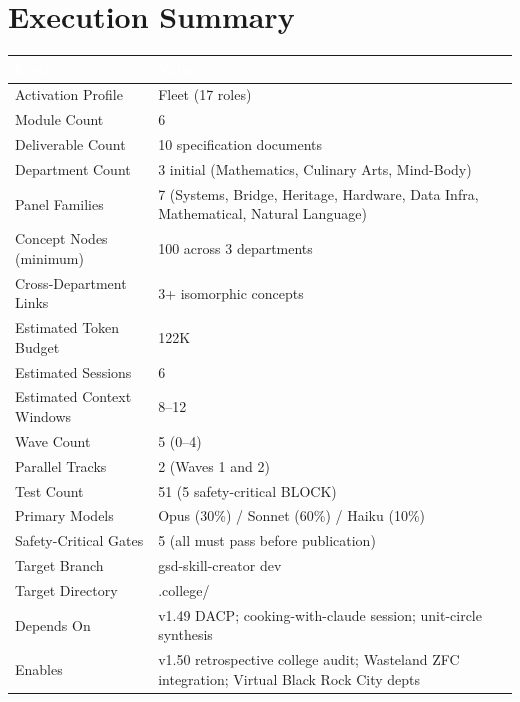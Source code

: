 \documentclass[11pt,letterpaper]{article}
\newcommand{\tableheader}[1]{\textbf{\sffamily\textcolor{white}{#1}}}
\begin{document}
\section{Execution Summary}

\begin{center}
\begin{tabularx}{\textwidth}{L{5cm}X}
\toprule
{}
\tableheader{Metric} & \tableheader{Value} \\
\midrule
Activation Profile & Fleet (17 roles) \\
Module Count & 6 \\
Deliverable Count & 10 specification documents \\
Department Count & 3 initial (Mathematics, Culinary Arts, Mind-Body) \\
Panel Families & 7 (Systems, Bridge, Heritage, Hardware, Data Infra, Mathematical, Natural Language) \\
Concept Nodes (minimum) & 100 across 3 departments \\
Cross-Department Links & 3+ isomorphic concepts \\
Estimated Token Budget & 122K \\
Estimated Sessions & 6 \\
Estimated Context Windows & 8--12 \\
Wave Count & 5 (0--4) \\
Parallel Tracks & 2 (Waves 1 and 2) \\
Test Count & 51 (5 safety-critical BLOCK) \\
Primary Models & Opus (30\%) / Sonnet (60\%) / Haiku (10\%) \\
Safety-Critical Gates & 5 (all must pass before publication) \\
Target Branch & gsd-skill-creator dev \\
Target Directory & .college/ \\
Depends On & v1.49 DACP; cooking-with-claude session; unit-circle synthesis \\
Enables & v1.50 retrospective college audit; Wasteland ZFC integration; Virtual Black Rock City depts \\
\bottomrule
\end{tabularx}
\end{center}
\end{document}
